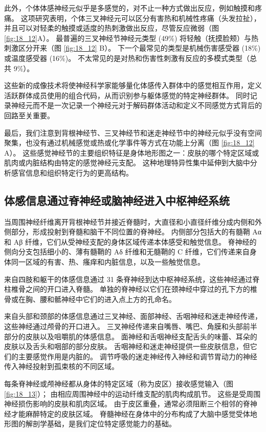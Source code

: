 此外，个体体感神经元似乎是多感觉的，对不止一种方式做出反应，例如触摸和疼痛。 
这项研究表明，个体三叉神经元可以区分有害热和机械性疼痛（头发拉扯），并且可以对轻柔的触摸或适度的热刺激做出反应，尽管反应微弱（图 \ref{fig:18_12}A）。 
最普遍的三叉神经节神经元类型 (49\%) 将轻触（抚摸脸颊）与热刺激区分开来（图 \ref{fig:18_12} B）。 
下一个最常见的类型是机械伤害感受器 (18\%) 或温度感受器 (16\%)。 
不太常见的是对热和伤害性刺激有反应的多模式类型（总共 9\%）。


这些新的成像技术将使神经科学家能够量化体感传入群体中的感觉相互作用，定义活跃群体成员使用的组合代码，从而识别参与躯体感觉的特定神经群体。 
同时记录神经元而不是一次记录一个神经元对于解码群体活动和定义不同感觉方式背后的回路至关重要。


最后，我们注意到背根神经节、三叉神经节和迷走神经节中的神经元似乎没有空间聚集，也没有通过机械感觉或热或化学事件等方式在功能上分离（图 \ref{fig:18_12} A）。 
这些感觉神经节的主要组织特征是身体地形图之一：皮肤的哪个特定区域或肌肉或内脏结构由特定的感觉神经元支配。 
这种地理特异性集中延伸到大脑中分析感官信息和组织特定行为的更高结构。


\subsection{体感信息通过脊神经或脑神经进入中枢神经系统}
当周围神经纤维离开背根神经节并接近脊髓时，大直径和小直径纤维分成内侧和外侧部分，形成投射到脊髓和脑干不同位置的脊神经。 
内侧部分包括大的有髓鞘 Aα 和 Aβ 纤维，它们从受神经支配的身体区域传递本体感受和触觉信息。 
脊神经的侧向分支包括细小的、薄有髓鞘的 Aδ 纤维和无髓鞘的 C 纤维，它们传递来自身体同一区域的有害、热、瘙痒和内脏信息，以及一些触觉信息。


来自四肢和躯干的体感信息通过 31 条脊神经到达中枢神经系统，这些神经通过脊柱椎骨之间的开口进入脊髓。 
单独的脊神经以它们在颈神经中穿过的孔下方的椎骨或在胸、腰和骶神经中它们的进入点上方的孔命名。


来自头部和颈部的体感信息通过三叉神经、面部神经、舌咽神经和迷走神经传递，这些神经通过颅骨的开口进入。 
三叉神经传递来自嘴唇、嘴巴、角膜和头部前半部分的皮肤以及咀嚼肌的体感信息。 
面神经和舌咽神经支配舌头的味蕾、耳朵的皮肤以及舌头和咽部的部分皮肤。 
舌咽神经和迷走神经提供一些皮肤信息，但它们的主要感觉作用是内脏的。 
调节呼吸的迷走神经传入神经和调节胃动力的神经传入神经投射到孤束核的不同区域。


每条脊神经或颅神经都从身体的特定区域（称为皮区）接收感觉输入（图 \ref{fig:18_13}）； 由相应周围神经中的运动纤维支配的肌肉构成肌节。 
这些是受周围神经损伤影响的皮肤和肌肉区域。 由于皮区重叠，通常必须阻断三个相邻的脊神经才能麻醉特定的皮肤区域。 
脊髓神经在身体中的分布构成了大脑中感觉受体地形图的解剖学基础，是我们定位特定感觉能力的基础。

